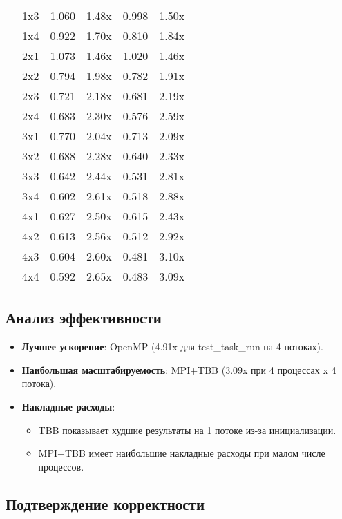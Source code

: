 \documentclass[a4paper,14pt]{extarticle}
\begin{document}
\begin{table}[H]
\begin{tabular}{lccccc}
            & 1x3 & 1.060 & 1.48x & 0.998 & 1.50x \\
            & 1x4 & 0.922 & 1.70x & 0.810 & 1.84x \\
            & 2x1 & 1.073 & 1.46x & 1.020 & 1.46x \\
            & 2x2 & 0.794 & 1.98x & 0.782 & 1.91x \\
            & 2x3 & 0.721 & 2.18x & 0.681 & 2.19x \\
            & 2x4 & 0.683 & 2.30x & 0.576 & 2.59x \\
            & 3x1 & 0.770 & 2.04x & 0.713 & 2.09x \\
            & 3x2 & 0.688 & 2.28x & 0.640 & 2.33x \\
            & 3x3 & 0.642 & 2.44x & 0.531 & 2.81x \\
            & 3x4 & 0.602 & 2.61x & 0.518 & 2.88x \\
            & 4x1 & 0.627 & 2.50x & 0.615 & 2.43x \\
            & 4x2 & 0.613 & 2.56x & 0.512 & 2.92x \\
            & 4x3 & 0.604 & 2.60x & 0.481 & 3.10x \\
            & 4x4 & 0.592 & 2.65x & 0.483 & 3.09x \\
        \bottomrule
    \end{tabular}
\end{table}

\subsection*{Анализ эффективности}

\begin{itemize}
    \item \textbf{Лучшее ускорение}: OpenMP (4.91x для test\_task\_run на 4 потоках).
    \item \textbf{Наибольшая масштабируемость}: MPI+TBB (3.09x при 4 процессах x 4 потока).
    \item \textbf{Накладные расходы}:
    \begin{itemize}
        \item TBB показывает худшие результаты на 1 потоке из-за инициализации.
        \item MPI+TBB имеет наибольшие накладные расходы при малом числе процессов.
    \end{itemize}
\end{itemize}

\subsection*{Подтверждение корректности}
\end{document}
